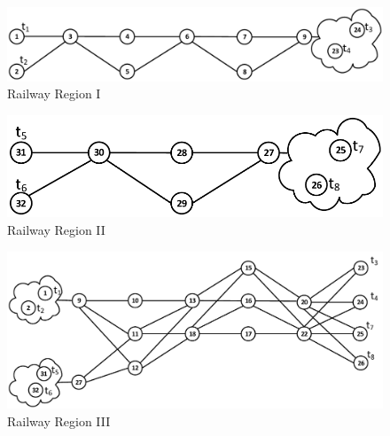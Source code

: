 \documentclass{ewic}
\begin{document}
			\begin{figure}[htp]
				\begin{centering}	
				\includegraphics[scale=0.35]{img/esempioScomp1}
				\caption{Railway Region I}
				\label{fig:scomposizione1}
				\end{centering}
			\end{figure}
			
			
			\begin{figure}[htp]
				\begin{centering}	
				\includegraphics[scale=0.35]{img/esempioScomp2}
				\caption{Railway Region II}
				\label{fig:scomposizione2}
				\end{centering}
			\end{figure}
			
			
			\begin{figure}[htp]
				\begin{centering}	
				\includegraphics[scale=0.35]{img/esempioScomp3}
				\caption{Railway Region III}
				\label{fig:scomposizione3}
				\end{centering}
			\end{figure}
			
			
			
			
			
\end{document}
